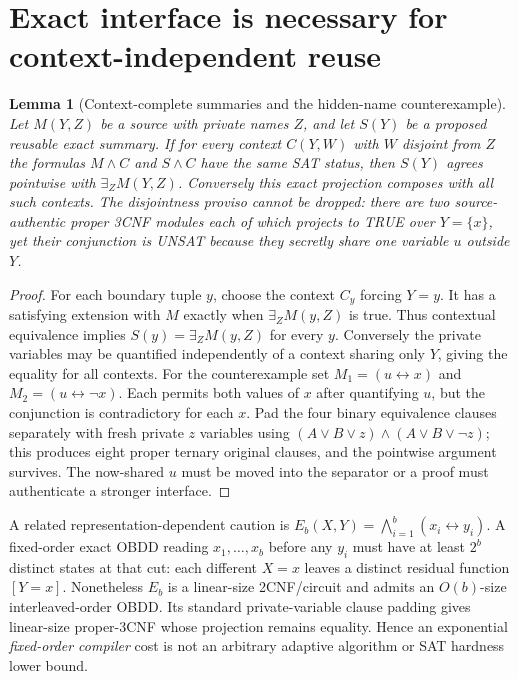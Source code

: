\documentclass[11pt]{article}
\newtheorem{lemma}[theorem]{Lemma}
\begin{document}
\section{Exact interface is necessary for context-independent reuse}
\begin{lemma}[Context-complete summaries and the hidden-name counterexample]\label{lem:interface}
Let $M(Y,Z)$ be a source with private names $Z$, and let $S(Y)$ be a proposed reusable exact summary. If for \emph{every} context $C(Y,W)$ with $W$ disjoint from $Z$ the formulas $M\wedge C$ and $S\wedge C$ have the same SAT status, then $S(Y)$ agrees pointwise with $\exists_Z M(Y,Z)$. Conversely this exact projection composes with all such contexts. The disjointness proviso cannot be dropped: there are two source-authentic proper 3CNF modules each of which projects to TRUE over $Y=\{x\}$, yet their conjunction is UNSAT because they secretly share one variable $u$ outside $Y$.
\end{lemma}
\begin{proof}
For each boundary tuple $y$, choose the context $C_y$ forcing $Y=y$. It has a satisfying extension with $M$ exactly when $\exists_ZM(y,Z)$ is true. Thus contextual equivalence implies $S(y)=\exists_Z M(y,Z)$ for every $y$. Conversely the private variables may be quantified independently of a context sharing only $Y$, giving the equality for all contexts. For the counterexample set $M_1=(u\leftrightarrow x)$ and $M_2=(u\leftrightarrow\neg x)$. Each permits both values of $x$ after quantifying $u$, but the conjunction is contradictory for each $x$. Pad the four binary equivalence clauses separately with fresh private $z$ variables using $(A\vee B\vee z)\land(A\vee B\vee\neg z)$; this produces eight proper ternary original clauses, and the pointwise argument survives. The now-shared $u$ must be moved into the separator or a proof must authenticate a stronger interface.\end{proof}

A related representation-dependent caution is $E_b(X,Y)=\bigwedge_{i=1}^b(x_i\leftrightarrow y_i)$. A fixed-order exact OBDD reading $x_1,\ldots,x_b$ before any $y_i$ must have at least $2^b$ distinct states at that cut: each different $X=x$ leaves a distinct residual function $[Y=x]$. Nonetheless $E_b$ is a linear-size 2CNF/circuit and admits an $O(b)$-size interleaved-order OBDD. Its standard private-variable clause padding gives linear-size proper-3CNF whose projection remains equality. Hence an exponential \emph{fixed-order compiler} cost is not an arbitrary adaptive algorithm or SAT hardness lower bound.
\end{document}
